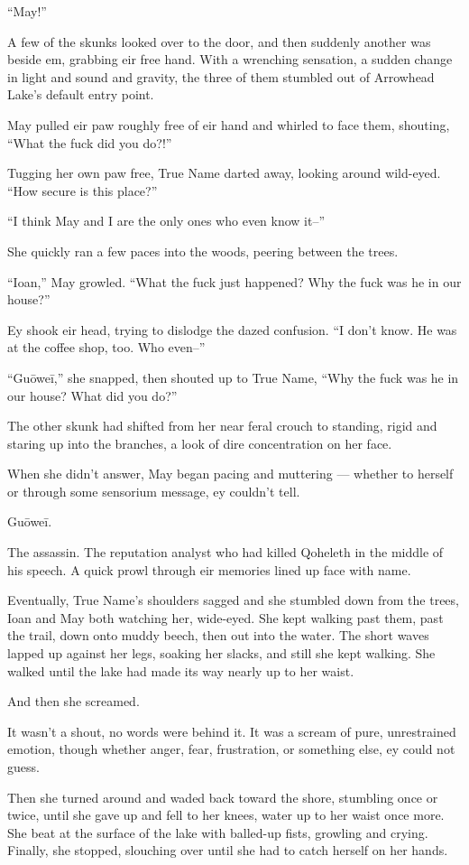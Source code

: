 ``May!''

A few of the skunks looked over to the door, and then suddenly another was beside em, grabbing eir free hand. With a wrenching sensation, a sudden change in light and sound and gravity, the three of them stumbled out of Arrowhead Lake's default entry point.

May pulled eir paw roughly free of eir hand and whirled to face them, shouting, ``What the fuck did you do?!''

Tugging her own paw free, True Name darted away, looking around wild-eyed. ``How secure is this place?''

``I think May and I are the only ones who even know it--''

She quickly ran a few paces into the woods, peering between the trees.

``Ioan,'' May growled. ``What the fuck just happened? Why the fuck was he in our house?''

Ey shook eir head, trying to dislodge the dazed confusion. ``I don't know. He was at the coffee shop, too. Who even--''

``Guōweī,'' she snapped, then shouted up to True Name, ``Why the fuck was he in our house? What did you do?''

The other skunk had shifted from her near feral crouch to standing, rigid and staring up into the branches, a look of dire concentration on her face.

When she didn't answer, May began pacing and muttering — whether to herself or through some sensorium message, ey couldn't tell.

Guōweī.

The assassin. The reputation analyst who had killed Qoheleth in the middle of his speech. A quick prowl through eir memories lined up face with name.

Eventually, True Name's shoulders sagged and she stumbled down from the trees, Ioan and May both watching her, wide-eyed. She kept walking past them, past the trail, down onto muddy beech, then out into the water. The short waves lapped up against her legs, soaking her slacks, and still she kept walking. She walked until the lake had made its way nearly up to her waist.

And then she screamed.

It wasn't a shout, no words were behind it. It was a scream of pure, unrestrained emotion, though whether anger, fear, frustration, or something else, ey could not guess.

Then she turned around and waded back toward the shore, stumbling once or twice, until she gave up and fell to her knees, water up to her waist once more. She beat at the surface of the lake with balled-up fists, growling and crying. Finally, she stopped, slouching over until she had to catch herself on her hands.

